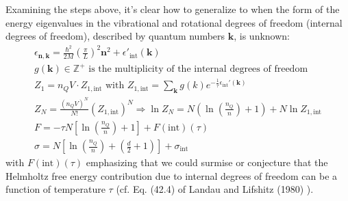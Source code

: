 Examining the steps above, it's clear how to generalize to when the form of the energy eigenvalues in the vibrational and rotational degrees of freedom (internal degrees of freedom), described by quantum numbers $\mathbf{k}$, is unknown:
\[
\begin{gathered}
  \epsilon_{\mathbf{n},\mathbf{k}} = \frac{ \hbar^2}{2M} \left( \frac{\pi}{L} \right)^2 \mathbf{n}^2  + \epsilon'_{\text{int}}(\mathbf{k}) \\
  g(\mathbf{k}) \in \mathbb{Z}^+ \text{ is the multiplicity of the internal degrees of freedom } \\ 
  Z_1 = n_Q V \cdot Z_{1,\text{int}} \text{ with } Z_{1,\text{int}} = \sum_{\mathbf{k}} g(k) e^{ -\frac{1}{\tau} \epsilon_{\text{int}}'(\mathbf{k}) } \\ 
  Z_N = \frac{ (n_Q V)^N}{N!} (Z_{1,\text{int}})^N  \Longrightarrow \ln{Z_N} = N \left( \ln{ \left( \frac{n_Q}{n} \right) } + 1 \right) + N \ln{ Z_{1,\text{int}} } \\ 
  F = -\tau N \left[ \ln{ \left( \frac{n_Q}{n} \right) + 1 } \right] + F(\text{int})(\tau) \\ 
  \sigma = N \left[ \ln{ \left( \frac{n_Q}{n} \right) } + \left( \frac{d}{2} + 1 \right) \right] + \sigma_{\text{int}}
\end{gathered}
\]
with $F(\text{int})(\tau)$ emphasizing that we could surmise or conjecture that the Helmholtz free energy contribution due to internal degrees of freedom can be a function of temperature $\tau$ (cf. Eq. (42.4) of Landau and Lifshitz (1980) \cite{LLandauELifshitz1980}).  



